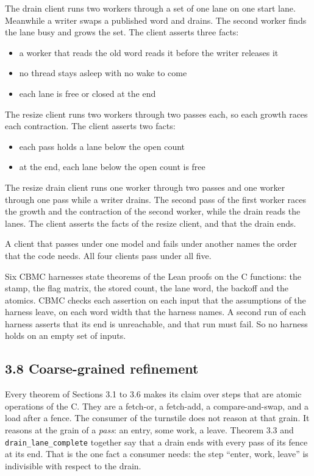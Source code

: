 The drain client runs two workers through a set of one lane on one start lane. Meanwhile a writer swaps a published word and drains. The second worker finds the lane busy and grows the set. The client asserts three facts:

\begin{itemize}
\item a worker that reads the old word reads it before the writer releases it
\item no thread stays asleep with no wake to come
\item each lane is free or closed at the end
\end{itemize}

The resize client runs two workers through two passes each, so each growth races each contraction. The client asserts two facts:

\begin{itemize}
\item each pass holds a lane below the open count
\item at the end, each lane below the open count is free
\end{itemize}

The resize drain client runs one worker through two passes and one worker through one pass while a writer drains. The second pass of the first worker races the growth and the contraction of the second worker, while the drain reads the lanes. The client asserts the facts of the resize client, and that the drain ends.

A client that passes under one model and fails under another names the order that the code needs. All four clients pass under all five.

Six CBMC harnesses state theorems of the Lean proofs on the C functions: the stamp, the flag matrix, the stored count, the lane word, the backoff and the atomics. CBMC checks each assertion on each input that the assumptions of the harness leave, on each word width that the harness names. A second run of each harness asserts that its end is unreachable, and that run must fail. So no harness holds on an empty set of inputs.

\subsection{\texorpdfstring{3.8 Coarse-grained refinement}{3.8 Coarse-grained refinement}}

Every theorem of Sections 3.1 to 3.6 makes its claim over steps that are atomic operations of the C. They are a fetch-or, a fetch-add, a compare-and-swap, and a load after a fence. The consumer of the turnstile does not reason at that grain. It reasons at the grain of a \emph{pass}: an entry, some work, a leave. Theorem 3.3 and \texttt{drain\_\allowbreak{}lane\_\allowbreak{}complete} together say that a drain ends with every pass of its fence at its end. That is the one fact a consumer needs: the step “enter, work, leave” is indivisible with respect to the drain.

